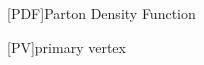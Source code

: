 \begin{acronym}[neos]
    [PDF]{Parton Density Function}


    [PV]{primary vertex}






\end{acronym}

